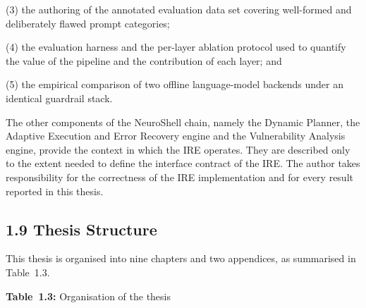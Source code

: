 \documentclass[
]{article}
\begin{document}
(3) the authoring of the annotated evaluation data set covering
well-formed and deliberately flawed prompt categories;

(4) the evaluation harness and the per-layer ablation protocol used to
quantify the value of the pipeline and the contribution of each layer;
and

(5) the empirical comparison of two offline language-model backends
under an identical guardrail stack.

The other components of the NeuroShell chain, namely the Dynamic
Planner, the Adaptive Execution and Error Recovery engine and the
Vulnerability Analysis engine, provide the context in which the IRE
operates. They are described only to the extent needed to define the
interface contract of the IRE. The author takes responsibility for the
correctness of the IRE implementation and for every result reported in
this thesis.

\hypertarget{thesis-structure}{%
\subsection{1.9 Thesis Structure}\label{thesis-structure}}

This thesis is organised into nine chapters and two appendices, as
summarised in Table~1.3.

\protect\hypertarget{_Toc900024}{}{}\textbf{Table~1.3:} Organisation of
the thesis
\end{document}
